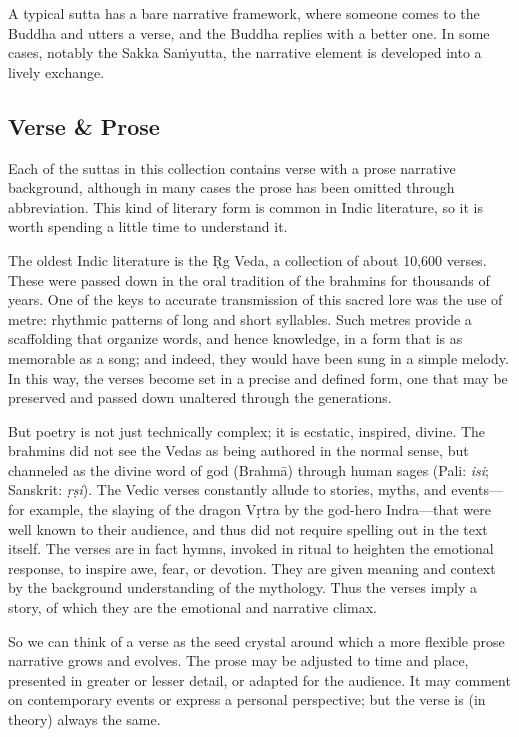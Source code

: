 \documentclass[12pt,openany]{book}%
\begin{document}
A typical sutta has a bare narrative framework, where someone comes to the Buddha and utters a verse, and the Buddha replies with a better one. In some cases, notably the Sakka \textsanskrit{Saṁyutta}, the narrative element is developed into a lively exchange.

\subsection*{Verse \& Prose}

Each of the suttas in this collection contains verse with a prose narrative background, although in many cases the prose has been omitted through abbreviation. This kind of literary form is common in Indic literature, so it is worth spending a little time to understand it.

The oldest Indic literature is the Ṛg Veda, a collection of about 10,600 verses. These were passed down in the oral tradition of the brahmins for thousands of years. One of the keys to accurate transmission of this sacred lore was the use of metre: rhythmic patterns of long and short syllables. Such metres provide a scaffolding that organize words, and hence knowledge, in a form that is as memorable as a song; and indeed, they would have been sung in a simple melody. In this way, the verses become set in a precise and defined form, one that may be preserved and passed down unaltered through the generations.

But poetry is not just technically complex; it is ecstatic, inspired, divine. The brahmins did not see the Vedas as being authored in the normal sense, but channeled as the divine word of god (\textsanskrit{Brahmā}) through human sages (Pali: \textit{isi}; Sanskrit: \textit{\textsanskrit{ṛṣi}}). The Vedic verses constantly allude to stories, myths, and events—for example, the slaying of the dragon \textsanskrit{Vṛtra} by the god-hero Indra—that were well known to their audience, and thus did not require spelling out in the text itself. The verses are in fact hymns, invoked in ritual to heighten the emotional response, to inspire awe, fear, or devotion. They are given meaning and context by the background understanding of the mythology. Thus the verses imply a story, of which they are the emotional and narrative climax.

So we can think of a verse as the seed crystal around which a more flexible prose narrative grows and evolves. The prose may be adjusted to time and place, presented in greater or lesser detail, or adapted for the audience. It may comment on contemporary events or express a personal perspective; but the verse is (in theory) always the same.
\end{document}

